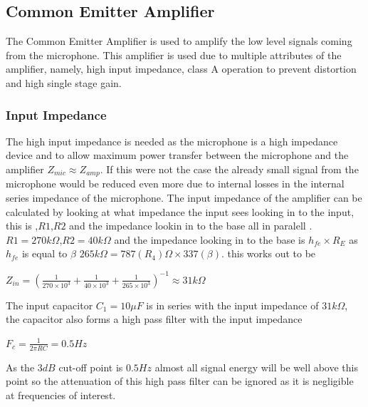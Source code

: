 \documentclass[10pt,a4paper]{article}
\begin{document}
\subsection{Common Emitter Amplifier}
The Common Emitter Amplifier is used to amplify the low level signals coming from the microphone. This amplifier is used due to multiple attributes of the amplifier, namely, high input impedance, class A operation to prevent distortion and high single stage gain.

\subsubsection{Input Impedance}
The high input impedance is needed as the microphone is a high impedance device and to allow maximum power transfer between the microphone and the amplifier $Z_{mic} \approx Z_{amp}$. If this were not the case the already small signal from the microphone would be reduced even more due to internal losses in the internal series impedance of the microphone. The input impedance of the amplifier can be calculated by looking at what impedance the input sees looking in to the input, this is ,$R1$,$R2$ and the impedance lookin in to the base all in paralell \cite{ArtElectronics}. $R1 = 270k\Omega$,$R2 = 40k\Omega$ and the impedance looking in to the base is $h_{fe} \times R_E$ as $h_{fe}$ is equal to $\beta$ \cite{ArtElectronics} $265k\Omega= 787(R_4)\Omega \times 337(\beta)$.
this works out to be  

\begin{center}
\Huge

$Z_{in}= (\frac{1}{270\times 10^{3}} +\frac{1}{40\times 10^{3}} + \frac{1}{265 \times 10^{3}} )^{-1} \approx 31k\Omega$



\end{center}
The input capacitor $C_1 = 10\mu F$ is in series with the input impedance of $31k\Omega$, the capacitor also forms a high pass filter with the input impedance 
\begin{center}
\Huge

$F_c = \frac{1}{2\pi RC} = 0.5Hz$



\end{center}
\cite{ArtElectronics}
As the $3dB$ cut-off point is $0.5Hz$ almost all signal energy will be well above this point so the attenuation of this high pass filter can be ignored as it is negligible at frequencies of interest.
\end{document}
